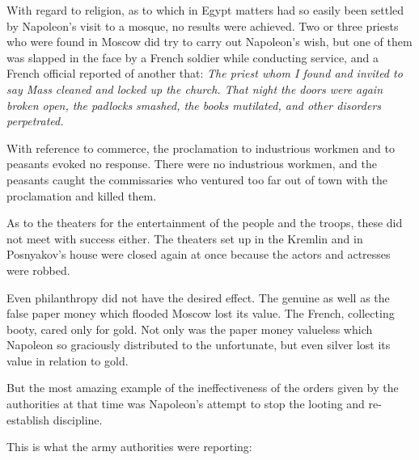 With regard to religion, as to which in Egypt matters had so
easily been settled by Napoleon's visit to a mosque, no results
were achieved. Two or three priests who were found in Moscow did
try to carry out Napoleon's wish, but one of them was slapped in
the face by a French soldier while conducting service, and a
French official reported of another that: \emph{The priest whom I
found and invited to say Mass cleaned and locked up the
church. That night the doors were again broken open, the padlocks
smashed, the books mutilated, and other disorders perpetrated.}

With reference to commerce, the proclamation to industrious
workmen and to peasants evoked no response. There were no
industrious workmen, and the peasants caught the commissaries who
ventured too far out of town with the proclamation and killed
them.

As to the theaters for the entertainment of the people and the
troops, these did not meet with success either. The theaters set
up in the Kremlin and in Posnyakov's house were closed again at
once because the actors and actresses were robbed.

Even philanthropy did not have the desired effect. The genuine as
well as the false paper money which flooded Moscow lost its
value. The French, collecting booty, cared only for gold. Not
only was the paper money valueless which Napoleon so graciously
distributed to the unfortunate, but even silver lost its value in
relation to gold.

But the most amazing example of the ineffectiveness of the orders
given by the authorities at that time was Napoleon's attempt to
stop the looting and re-establish discipline.

This is what the army authorities were reporting:

